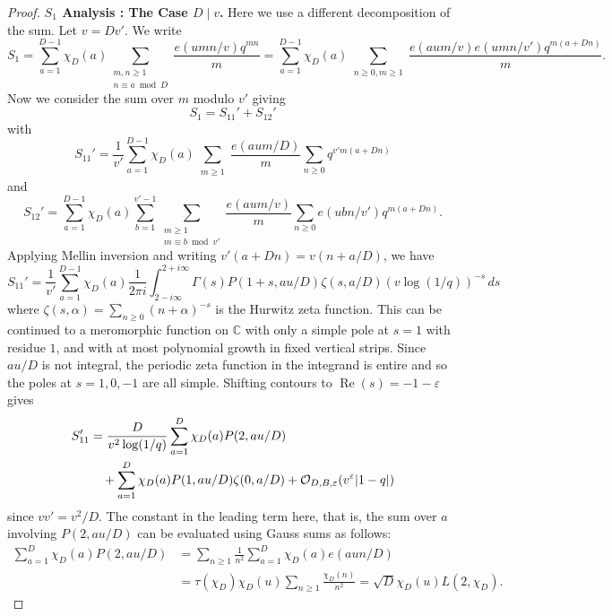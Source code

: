\documentclass[10pt,a4paper]{amsart}
\newcommand{\m}{\mathrm{m}}
\newcommand{\mb}{\mathbb}
\newcommand{\mf}{\mathfrak}
\newcommand{\n}{\mf{n}_D}
\begin{document}
\begin{proof}

\noindent \textbf{$S_1$ Analysis : The Case $D \mid v$.} Here we use a different decomposition of the sum. Let $v=Dv'$. We write
\[
S_1
=
\sum_{a=1}^{D-1}\chi_D(a)\sum_{\substack{m,n\geq 1\\n\equiv a \bmod D}}\frac{e(umn/v)q^{mn}}{m}
=
\sum_{a=1}^{D-1}\chi_D(a)\sum_{\substack{n\geq 0,m\geq 1}}\frac{e(aum/v)e(umn/v')q^{m(a+Dn)}}{m}.
\]
Now we consider the sum over $m$ modulo $v'$ giving 
\[
S_1=S_{11}'+S_{12}'
\]
with 
\[
S_{11}'
=
\frac{1}{v'}\sum_{a=1}^{D-1}\chi_D(a)\sum_{\substack{m\geq 1}}\frac{e(aum/D)}{m}\sum_{n\geq 0}q^{v'm(a+Dn)}
\]
and
\[
S_{12}'
=
\sum_{a=1}^{D-1}\chi_D(a)\sum_{b=1}^{v'-1}\sum_{\substack{m\geq 1\\m\equiv b \bmod v'}}\frac{e(aum/v)}{m}\sum_{n\geq 0}e(ubn/v')q^{m(a+Dn)}.
\]
Applying Mellin inversion and writing $v'(a+Dn)=v(n+a/D)$, we have 
\[
S_{11}'
=
\frac{1}{v'}\sum_{a=1}^{D-1}\chi_D(a)
\frac{1}{2\pi i }\int_{2-i\infty}^{2+i\infty}
\Gamma(s)P(1+s, au/D)\zeta(s,a/D)(v\log(1/q))^{-s}\, ds
\]
where $\zeta(s,\alpha)=\sum_{n\geq 0}(n+\alpha)^{-s}$ is the Hurwitz zeta function. This can be continued to a meromorphic function on $\mb{C}$ with only a simple pole at $s=1$ with residue $1$, and with at most polynomial growth in fixed vertical strips. Since $au/D$ is not integral, the periodic zeta function in the integrand is entire and so the poles at $s=1,0,-1$ are all simple. Shifting contours to $\operatorname{Re}(s)=-1-\varepsilon$ gives
\begin{align} \label{S11' Contribution}
S_{11}'
&=
\frac{D}{v^2\log(1/q)}\sum_{a=1}^D\chi_D(a)P(2,au/D) \notag \\
&\quad +
\sum_{a=1}^D\chi_D(a)P(1,au/D)\zeta(0,a/D)
+\mathcal{O}_{D,B, \varepsilon}(v^{\varepsilon}|1-q|)
\end{align} 
since $vv'=v^2/D$.
The constant in the leading term here, that is, the sum over $a$ involving $P(2,au/D)$ can be evaluated using Gauss sums as follows: 
\begin{align*}
\sum_{a=1}^D\chi_D(a)P(2,au/D) &=\sum_{n\geq 1}\frac{1}{n^2}\sum_{a=1}^D\chi_D(a)e(aun/D)\\
&=
\tau(\chi_D)\chi_D(u)\sum_{n\geq 1}\frac{\chi_D(n)}{n^2}
=
\sqrt{D}\chi_D(u)L(2,\chi_D).
\end{align*}




\end{proof}
\end{document}
